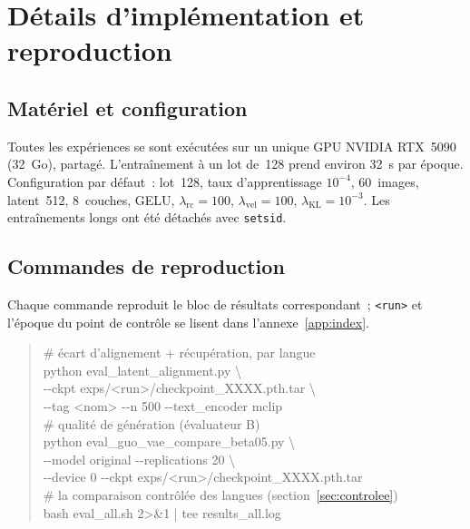 \documentclass[12pt,a4paper,oneside]{report}
\theoremstyle{definition}
\theoremstyle{plain}
\newcommand{\lkl}{\ensuremath{\lambda_{\mathrm{KL}}}}
\newcommand{\lrc}{\ensuremath{\lambda_{\mathrm{rc}}}}
\newcommand{\lvel}{\ensuremath{\lambda_{\mathrm{vel}}}}
\begin{document}
\appendix
\renewcommand{\chaptername}{Annexe}

\chapter{Détails d'implémentation et reproduction}
\label{app:impl}

\section{Matériel et configuration}
Toutes les expériences se sont exécutées sur un unique GPU NVIDIA RTX~5090
(32~Go), partagé. L'entraînement à un lot de~128 prend environ 32~s par époque.
Configuration par défaut~: lot~128, taux d'apprentissage $10^{-4}$, 60~images,
latent~512, 8~couches, GELU, $\lrc=100$, $\lvel=100$, $\lkl=10^{-3}$. Les
entraînements longs ont été détachés avec \texttt{setsid}.

\section{Commandes de reproduction}
Chaque commande reproduit le bloc de résultats correspondant~; \texttt{<run>} et
l'époque du point de contrôle se lisent dans l'annexe~\ref{app:index}.

\begingroup
\small\ttfamily\setlength{\parindent}{0pt}
\begin{quote}
\# écart d'alignement + récupération, par langue\\
python eval\_latent\_alignment.py \textbackslash\\
\hspace*{2em}-{}-ckpt exps/<run>/checkpoint\_XXXX.pth.tar \textbackslash\\
\hspace*{2em}-{}-tag <nom> -{}-n 500 -{}-text\_encoder mclip\\[6pt]
\# qualité de génération (évaluateur B)\\
python eval\_guo\_vae\_compare\_beta05.py \textbackslash\\
\hspace*{2em}-{}-model original -{}-replications 20 \textbackslash\\
\hspace*{2em}-{}-device 0 -{}-ckpt exps/<run>/checkpoint\_XXXX.pth.tar\\[6pt]
\# la comparaison contrôlée des langues (section~\ref{sec:controlee})\\
bash eval\_all.sh 2>\&1 | tee results\_all.log
\end{quote}
\endgroup
\end{document}
